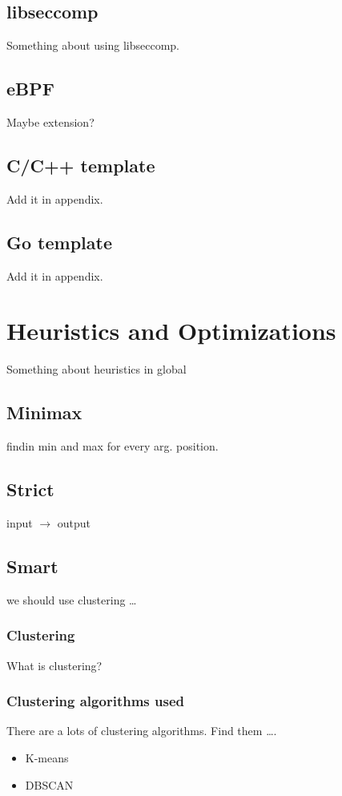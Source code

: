 \subsection{libseccomp}
Something about using libseccomp.
\subsection{eBPF}
Maybe extension?
\subsection{C/C++ template}
Add it in appendix.
\subsection{Go template}
Add it in appendix.

\section{Heuristics and Optimizations}
Something about heuristics in global
\subsection{Minimax}
findin min and max for every arg. position.
\subsection{Strict}
input $\rightarrow$ output
\subsection{Smart}
we should use clustering \ldots
\subsubsection{Clustering}
What is clustering?
\subsubsection{Clustering algorithms used}
There are a lots of clustering algorithms. Find them \ldots.
\begin{itemize}
	\item{K-means}
	\item{DBSCAN\cite{Mahesh_Kumar2016}}
\end{itemize}



